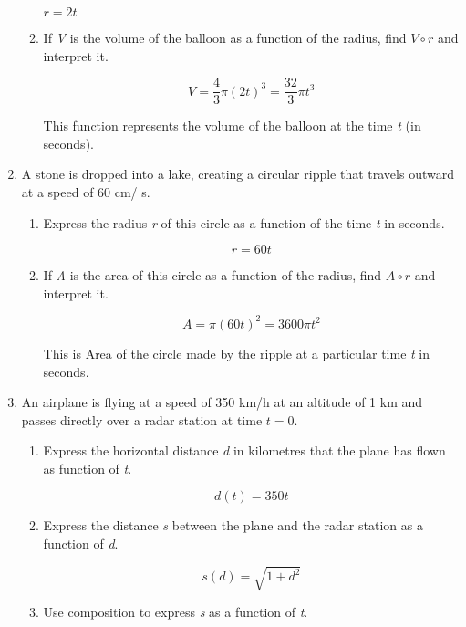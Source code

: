\documentclass{article}
\begin{document}
\begin{enumerate}
\begin{enumerate}
			$r = 2t$
			
			\item If \emph{V} is the volume of the balloon as a function of the radius, find $V \circ r$ and interpret
				it.

			$$V = \frac{4}{3}\pi(2t)^3 = \frac{32}{3}\pi t^3$$
			
			This function represents the volume of the balloon at the time \emph{t} (in seconds).
				
		\end{enumerate}
		
		\item A stone is dropped into a lake, creating a circular ripple that travels outward at a speed of 60 cm/ s.
		
		\begin{enumerate}
		
			\item Express the radius \emph{r} of this circle as a function of the time \emph{t} in seconds.
			
				$$r = 60t$$
				
			\item If \emph{A} is the area of this circle as a function of the radius, find $A \circ r$ and interpret it.
				
				$$A = \pi(60t)^2 = 3600\pi t^2$$
				
			This is Area of the circle made by the ripple at a particular time \emph{t} in seconds.

				
		\end{enumerate}
		
		\item An airplane is flying at a speed of 350 km/h at an altitude of 1 km and passes directly over a radar
			station at time $t = 0$.
			
		\begin{enumerate}
			\item Express the horizontal distance \emph{d} in kilometres that the plane has flown as function
				of \emph{t}.
				
				$$d(t) = 350t$$
				
			\item Express the distance \emph{s} between the plane and the radar station as a function of \emph{d}.
			
				$$s(d) = \sqrt{1 + d^2}$$
				
			\item Use composition to express \emph{s} as a function of \emph{t}.
			

\end{enumerate}
\end{enumerate}
\end{document}
